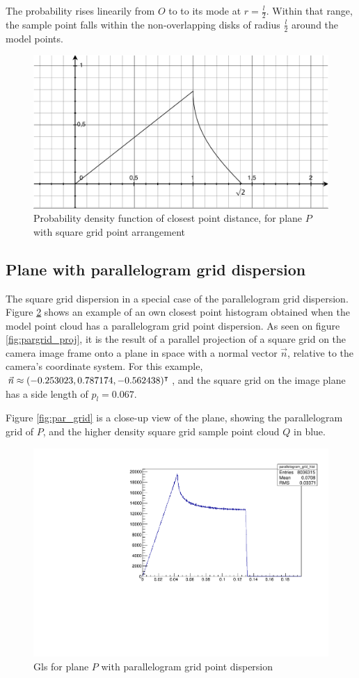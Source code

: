 The probability rises linearily from $O$ to to its mode at $r = \frac{l}{2}$. Within that range, the sample point falls within the non-overlapping disks of radius $\frac{l}{2}$ around the model points.

\begin{figure}[h]
\centering
\includegraphics[width=.3\textwidth]{fig/sq_grid_d.pdf}
\caption{Probability density function of closest point distance, for plane $P$ with square grid point arrangement}
\label{fig:sq_grid_d}
\end{figure}

\FloatBarrier

\subsection{Plane with parallelogram grid dispersion}
The square grid dispersion in a special case of the parallelogram grid dispersion. Figure \ref{fig:plane_par_cphist} shows an example of an own closest point histogram obtained when the model point cloud has a parallelogram grid point dispersion. As seen on figure \ref{fig:pargrid_proj}, it is the result of a parallel projection of a square grid on the camera image frame onto a plane in space with a normal vector $\vec{n}$, relative to the camera's coordinate system. For this example, $\vec{n} \approx (-0.253023, 0.787174, -0.562438)^\intercal$, and the square grid on the image plane has a side length of $p_l = 0.067$.

Figure \ref{fig:par_grid} is a close-up view of the plane, showing the parallelogram grid of $P$, and the higher density square grid sample point cloud $Q$ in blue.


\begin{figure}[H]
\centering
\includegraphics[width=.4\textwidth]{fig/parallelogram_grid.pdf}
\caption{\gls{Gls} for plane $P$ with parallelogram grid point dispersion}
\label{fig:plane_par_cphist}
\end{figure}

